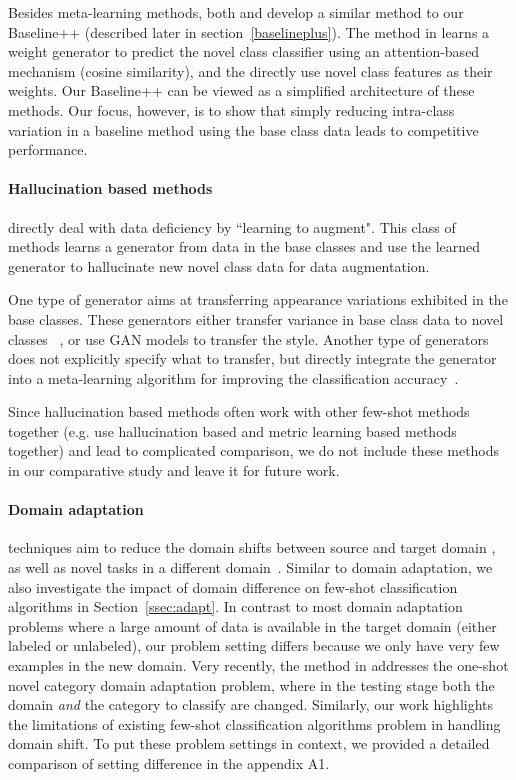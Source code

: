 Besides meta-learning methods, both \cite{gidaris2018dynamic} and \cite{qi2018low} develop a similar method to our Baseline++ (described later in section~\ref{baselineplus}).  
The method in \cite{gidaris2018dynamic} learns a weight generator to predict the novel class classifier using an attention-based mechanism (cosine similarity), and the \cite{qi2018low} directly use novel class features as their weights. Our Baseline++ can be viewed as a simplified architecture of these methods. Our focus, however, is to show that simply reducing intra-class variation in a baseline method using the base class data leads to competitive performance. 

\paragraph{Hallucination based methods} directly deal with data deficiency by ``learning to augment". This class of methods learns a generator from data in the base classes and use the learned generator to hallucinate new novel class data for data augmentation.

One type of generator aims at transferring appearance variations exhibited in the base classes. These generators either transfer variance in base class data to novel classes ~\cite{hariharan2017low}, or use GAN models \cite{antoniou2018data} to transfer the style. Another type of generators does not explicitly specify what to transfer, but directly integrate the generator into a meta-learning algorithm for improving the classification accuracy~\cite{wang2018low}.

Since hallucination based methods often work with other few-shot methods together (e.g. use hallucination based and metric learning based methods together) and lead to complicated comparison, we do not include these methods in our comparative study and leave it for future work.

\paragraph{Domain adaptation} techniques aim to reduce the domain shifts between source and target domain \cite{pan2010survey,ganin2015unsupervised}, as well as novel tasks in a different domain~\cite{hsu2017learning}. Similar to domain adaptation, we also investigate the impact of domain difference on few-shot classification algorithms in Section~\ref{ssec:adapt}. In contrast to most domain adaptation problems where a large amount of data is available in the target domain (either labeled or unlabeled), our problem setting differs because we only have very few examples in the new domain. Very recently, the method in \cite{dong2018domain} addresses the one-shot novel category domain adaptation problem, where in the testing stage both the domain \emph{and} the category to classify are changed. Similarly, our work highlights the limitations of existing few-shot classification algorithms problem in handling domain shift. To put these problem settings in context, we provided a detailed comparison of setting difference in the appendix A1.


